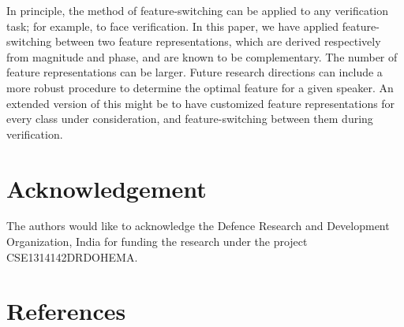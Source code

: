 \documentclass[preprint,12pt,5p]{elsarticle}
\begin{document}
In principle, the method of feature-switching can be applied to any verification
task; for example, to face verification. In this paper, we have applied
feature-switching between two feature representations, which are derived
respectively from magnitude and phase, and are known to be complementary. 
The number of feature representations can be larger. Future
research directions can include a more robust procedure to determine the optimal
feature for a given speaker. An extended version of this might be to have customized
feature representations for every class under consideration, and
feature-switching between them during verification.

\section{Acknowledgement}
\label{sec:ack}
The authors would like to acknowledge the Defence Research and Development 
Organization, India for funding the research under the project 
CSE1314142DRDOHEMA. 

\flushend
\appendix


\section*{References}

%

\end{document}

